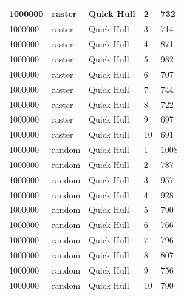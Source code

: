\documentclass[12pt]{article}
\begin{document}
\begin{longtable}{|l|l|l|l|l|}
1000000      & raster            & Quick Hull & 2          & 732                           \\ \hline
1000000      & raster            & Quick Hull & 3          & 714                           \\ \hline
1000000      & raster            & Quick Hull & 4          & 871                           \\ \hline
1000000      & raster            & Quick Hull & 5          & 982                           \\ \hline
1000000      & raster            & Quick Hull & 6          & 707                           \\ \hline
1000000      & raster            & Quick Hull & 7          & 744                           \\ \hline
1000000      & raster            & Quick Hull & 8          & 722                           \\ \hline
1000000      & raster            & Quick Hull & 9          & 697                           \\ \hline
1000000      & raster            & Quick Hull & 10         & 691                           \\ \hline
1000000      & random            & Quick Hull & 1          & 1008                          \\ \hline
1000000      & random            & Quick Hull & 2          & 787                           \\ \hline
1000000      & random            & Quick Hull & 3          & 957                           \\ \hline
1000000      & random            & Quick Hull & 4          & 928                           \\ \hline
1000000      & random            & Quick Hull & 5          & 790                           \\ \hline
1000000      & random            & Quick Hull & 6          & 766                           \\ \hline
1000000      & random            & Quick Hull & 7          & 796                           \\ \hline
1000000      & random            & Quick Hull & 8          & 807                           \\ \hline
1000000      & random            & Quick Hull & 9          & 756                           \\ \hline
1000000      & random            & Quick Hull & 10         & 790                           \\ \hline

\end{longtable}
\end{document}
